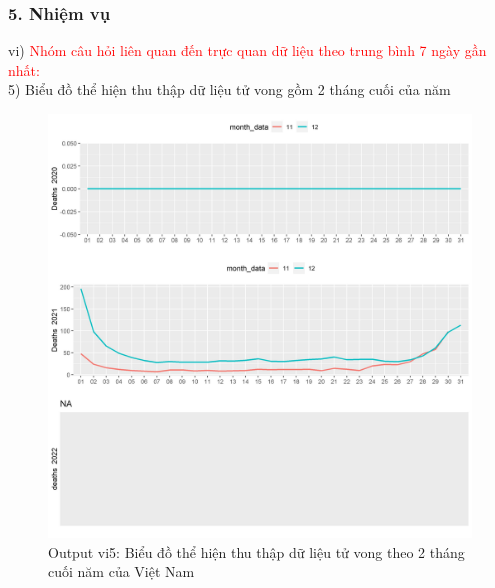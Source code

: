 \documentclass[english,10pt,table]{beamer}
\begin{document}
\begin{frame}[fragile]
\frametitle{5.  Nhiệm vụ}
vi) \textcolor{red}{Nhóm câu hỏi liên quan đến trực quan dữ liệu theo trung bình 7 ngày gần nhất:}\\
     5) Biểu đồ thể hiện thu thập dữ liệu tử vong gồm 2 tháng cuối của năm
	\begin{figure}[h!]
	\begin{center}
		    \includegraphics[scale = 0.26]{Images/VI/vi5 Vietnam .jpeg}
		     \caption{Output vi5: Biểu đồ thể hiện thu thập dữ liệu tử vong theo 2 tháng cuối năm của Việt Nam}
		\end{center}
		\end{figure}
\end{frame}
\end{document}
